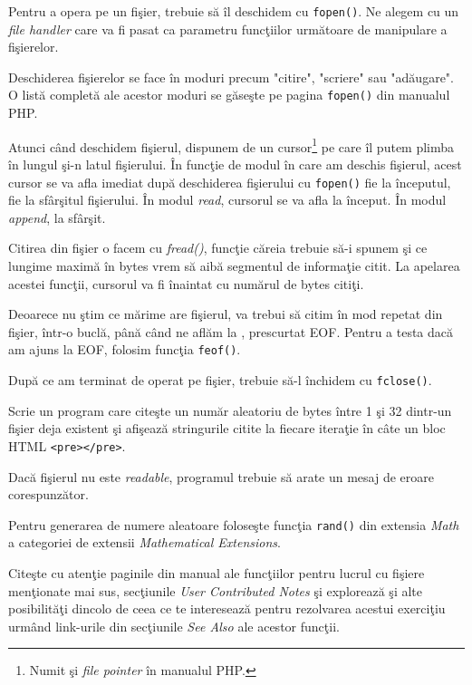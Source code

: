 Pentru a opera pe un fişier, trebuie să îl deschidem cu
\texttt{fopen()}. Ne alegem cu un \textsl{file handler}
care va fi pasat ca parametru funcţiilor următoare
de manipulare a fişierelor.

Deschiderea fişierelor se face în moduri precum "citire",
"scriere" sau "adăugare". O listă completă ale acestor
moduri se găseşte pe pagina \texttt{fopen()} din manualul
PHP.

Atunci când deschidem fişierul, dispunem de un cursor\footnote{Numit şi
\textit{file pointer} în manualul PHP.}
pe care îl putem plimba în lungul şi-n latul fişierului.
În funcţie de modul în care am deschis fişierul, acest
cursor se va afla imediat după deschiderea
fişierului cu \texttt{fopen()} fie la începutul, fie la sfârşitul
fişierului. În modul \textit{read}, cursorul se va
afla la început. În modul \textit{append}, la sfârşit.

Citirea din fişier o facem cu \textsl{fread()}, funcţie căreia trebuie
să-i spunem şi ce lungime maximă în bytes vrem să aibă segmentul
de informaţie citit.
La apelarea acestei funcţii, cursorul va fi înaintat cu numărul
de bytes citiţi.

Deoarece nu ştim ce mărime are fişierul, va trebui să citim
în mod repetat din fişier, într-o buclă, până când ne aflăm
la , prescurtat EOF.
Pentru a testa dacă am ajuns la EOF, folosim funcţia \texttt{feof()}.

După ce am terminat de operat pe fişier, trebuie să-l închidem cu
\texttt{fclose()}.

\begin{Exercise}[title={Citeşte din fişier}]
Scrie un program care 
citeşte un număr aleatoriu de bytes între 1 şi 32 dintr-un fişier deja existent
şi afişează stringurile citite la fiecare iteraţie în câte
un bloc HTML \texttt{<pre></pre>}.

Dacă fişierul nu este \textit{readable}, programul trebuie
să arate un mesaj de eroare corespunzător.

Pentru generarea de numere aleatoare foloseşte funcţia
\texttt{rand()} din extensia \textit{Math} a categoriei
de extensii \textit{Mathematical Extensions}.

Citeşte cu atenţie paginile din manual ale funcţiilor pentru
lucrul cu fişiere menţionate mai sus, secţiunile \textit{User
Contributed Notes} şi explorează şi alte posibilităţi
dincolo de ceea ce te interesează pentru rezolvarea acestui
exerciţiu urmând link-urile din secţiunile \textit{See Also}
ale acestor funcţii.
\end{Exercise}

